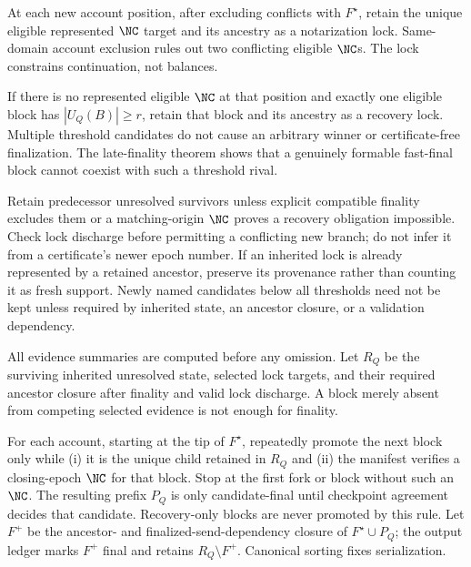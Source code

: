 At each new account position, after excluding conflicts with $F^\star$, retain the unique eligible represented $\NC$ target and its ancestry as a notarization lock. Same-domain account exclusion rules out two conflicting eligible $\NC$s. The lock constrains continuation, not balances.

If there is no represented eligible $\NC$ at that position and exactly one eligible block has $|U_Q(B)|\geq r$, retain that block and its ancestry as a recovery lock. Multiple threshold candidates do not cause an arbitrary winner or certificate-free finalization. The late-finality theorem shows that a genuinely formable fast-final block cannot coexist with such a threshold rival.

Retain predecessor unresolved survivors unless explicit compatible finality excludes them or a matching-origin $\NC$ proves a recovery obligation impossible. Check lock discharge before permitting a conflicting new branch; do not infer it from a certificate's newer epoch number. If an inherited lock is already represented by a retained ancestor, preserve its provenance rather than counting it as fresh support. Newly named candidates below all thresholds need not be kept unless required by inherited state, an ancestor closure, or a validation dependency.

All evidence summaries are computed before any omission. Let $R_Q$ be the surviving inherited unresolved state, selected lock targets, and their required ancestor closure after finality and valid lock discharge. A block merely absent from competing selected evidence is not enough for finality.

For each account, starting at the tip of $F^\star$, repeatedly promote the next block only while (i) it is the unique child retained in $R_Q$ and (ii) the manifest verifies a closing-epoch $\NC$ for that block. Stop at the first fork or block without such an $\NC$. The resulting prefix $P_Q$ is only candidate-final until checkpoint agreement decides that candidate. Recovery-only blocks are never promoted by this rule. Let $F^+$ be the ancestor- and finalized-send-dependency closure of $F^\star\cup P_Q$; the output ledger marks $F^+$ final and retains $R_Q\setminus F^+$. Canonical sorting fixes serialization.

